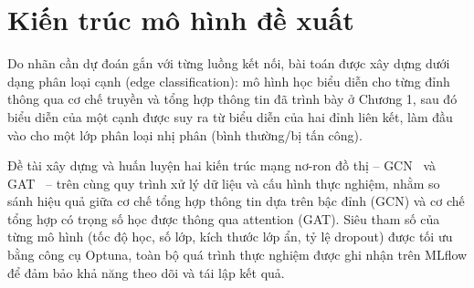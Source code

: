 \section{Kiến trúc mô hình đề xuất}

Do nhãn cần dự đoán gắn với từng luồng kết nối, bài toán được xây dựng dưới dạng phân loại cạnh (edge classification): mô hình học biểu diễn cho từng đỉnh thông qua cơ chế truyền và tổng hợp thông tin đã trình bày ở Chương 1, sau đó biểu diễn của một cạnh được suy ra từ biểu diễn của hai đỉnh liên kết, làm đầu vào cho một lớp phân loại nhị phân (bình thường/bị tấn công).

Đề tài xây dựng và huấn luyện hai kiến trúc mạng nơ-ron đồ thị -- GCN~\cite{kipf2017gcn} và GAT~\cite{velickovic2018gat} -- trên cùng quy trình xử lý dữ liệu và cấu hình thực nghiệm, nhằm so sánh hiệu quả giữa cơ chế tổng hợp thông tin dựa trên bậc đỉnh (GCN) và cơ chế tổng hợp có trọng số học được thông qua attention (GAT). Siêu tham số của từng mô hình (tốc độ học, số lớp, kích thước lớp ẩn, tỷ lệ dropout) được tối ưu bằng công cụ Optuna, toàn bộ quá trình thực nghiệm được ghi nhận trên MLflow để đảm bảo khả năng theo dõi và tái lập kết quả.